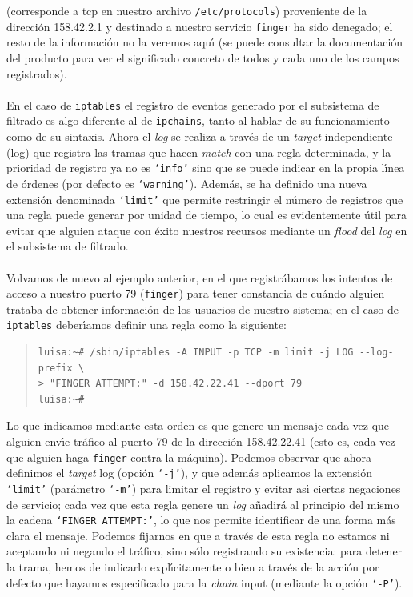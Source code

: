 (corresponde a {\sc tcp} en nuestro archivo {\tt /etc/protocols}) proveniente
de la direcci\'on 158.42.2.1 y destinado a nuestro servicio {\tt finger} ha 
sido denegado; el resto de la informaci\'on no la veremos aqu\'{\i} (se puede
consultar la documentaci\'on del producto para ver el significado concreto de
todos y cada uno de los campos registrados).\\
\\En el caso de {\tt iptables} el registro de eventos generado por el 
subsistema de filtrado es algo diferente al de {\tt ipchains}, tanto al hablar 
de su funcionamiento como de su sintaxis. Ahora el {\it log} se realiza a 
trav\'es de un {\it target} independiente ({\sc log}) que registra las tramas
que hacen {\it match} con una regla determinada, y la prioridad de registro ya 
no es {\tt `info'} sino que se puede indicar en la propia l\'{\i}nea de 
\'ordenes (por defecto es {\tt `warning'}). Adem\'as, se ha definido una nueva
extensi\'on denominada {\tt `limit'} que permite restringir el n\'umero de
registros que una regla puede generar por unidad de tiempo, lo cual es 
evidentemente \'util para evitar que alguien ataque con \'exito nuestros 
recursos mediante un {\it flood} del {\it log} en el subsistema de filtrado.\\
\\Volvamos de nuevo al ejemplo anterior, en el que registr\'abamos los intentos
de acceso a nuestro puerto 79 ({\tt finger}) para tener constancia de cu\'ando
alguien trataba de obtener informaci\'on de los usuarios de nuestro sistema; en
el caso de {\tt iptables} deber\'{\i}amos definir una regla como la
siguiente:
\begin{quote}
\begin{verbatim}
luisa:~# /sbin/iptables -A INPUT -p TCP -m limit -j LOG --log-prefix \
> "FINGER ATTEMPT:" -d 158.42.22.41 --dport 79
luisa:~# 
\end{verbatim}
\end{quote}
Lo que indicamos mediante esta orden es que genere un mensaje cada vez que
alguien env\'{\i}e tr\'afico al puerto 79 de la direcci\'on 158.42.22.41 (esto
es, cada vez que alguien haga {\tt finger} contra la m\'aquina). Podemos
observar que ahora definimos el {\it target} {\sc log} (opci\'on {\tt `-j'}), y
que adem\'as aplicamos la extensi\'on {\tt `limit'} (par\'ametro {\tt `-m'})
para limitar el registro y evitar as\'{\i} ciertas negaciones de servicio; cada
vez que esta regla genere un {\it log} a\~nadir\'a al principio del mismo la
cadena {\tt `FINGER ATTEMPT:'}, lo que nos permite identificar de una forma 
m\'as clara el mensaje. Podemos fijarnos en que a trav\'es de esta regla no 
estamos ni aceptando ni negando el tr\'afico, sino s\'olo registrando su 
existencia: para detener la trama, hemos de indicarlo expl\'{\i}citamente o
bien a trav\'es de la acci\'on por defecto que hayamos especificado para la {\it
chain} {\sc input} (mediante la opci\'on {\tt `-P'}).
